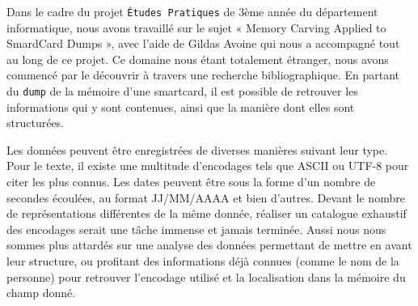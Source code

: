 Dans le cadre du projet \texttt{Études Pratiques} de 3ème année du département informatique, nous avons travaillé sur le sujet « Memory Carving Applied to SmardCard Dumps », avec l'aide de Gildas Avoine qui nous a accompagné tout au long de ce projet. Ce domaine nous étant totalement étranger, nous avons commencé par le découvrir à travers une recherche bibliographique. En partant du \texttt{dump} de la mémoire d'une smartcard, il est possible de retrouver les informations qui y sont contenues, ainsi que la manière dont elles sont structurées.

Les données peuvent être enregistrées de diverses manières suivant leur type. Pour le texte, il existe une multitude d'encodages tels que ASCII ou UTF-8 pour citer les plus connus. Les dates peuvent être sous la forme d'un nombre de secondes écoulées, au format JJ/MM/AAAA et bien d'autres. Devant le nombre de représentations différentes de la même donnée, réaliser un catalogue exhaustif des encodages serait une tâche immense et jamais terminée. Aussi nous nous sommes plus attardés sur une analyse des données permettant de mettre en avant leur structure, ou profitant des informations déjà connues (comme le nom de la personne) pour retrouver l'encodage utilisé et la localisation dans la mémoire du champ donné.

